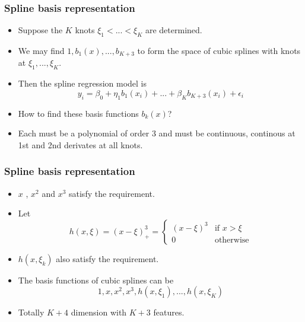 \documentclass{beamer}
\begin{document}
                   \begin{frame}
                   \frametitle{Spline basis representation   }
                   \begin{itemize}
                   \item  Suppose the $K$ knots $\xi_1< ... < \xi_K$ are determined.
                   \item We may find $1, b_1(x), ..., b_{K+3}$ to form the space of cubic splines with knots
                   at $\xi_1, ..., \xi_K$. 
                   \item Then the spline regression model is 
                   $$y_i = \beta_0 + \eta_1 b_1(x_i) + ... + \beta_K b_{K+3}(x_i) + \epsilon_i$$
                   \item How to find these basis functions $b_k(x)$?
                   \item Each must be a polynomial of order 3 and must be continuous, continous at
                   1st and 2nd derivates at all knots.
                  
                   \end{itemize}
                   \end{frame} 
                  
              
                   \begin{frame}
                   	\frametitle{Spline basis representation   }
                   	\begin{itemize}
                   		\item $x $ , $x^2$ and $x^3$ satisfy the requirement.
                   		\item Let 
                   		$$ h(x, \xi)= (x-\xi)_+^3= \begin{cases} 
                   		(x-\xi)^3 & \text{if  } x > \xi   \\
                   		0   & \text{otherwise} 
                   		\end{cases}$$
                   		
                   		\item $h(x, \xi_k)$ also satisfy the requirement.
                   		\item The basis functions of cubic splines can be
                   		$$1, x, x^2, x^3, h(x, \xi_1), ..., h(x, \xi_K)$$
                   		\item Totally   $K+4$ dimension with $K+3$ features.
                   		
                   	\end{itemize}
                   \end{frame} 
                   
\end{document}
